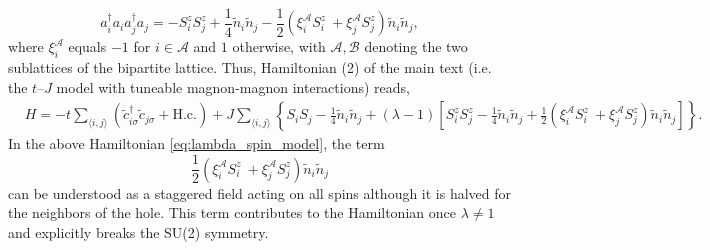 \documentclass[%
 reprint,
 amsmath,amssymb,
 aps,
prl,
]{revtex4-1}
\newcommand{\mean}[1]{\langle#1\rangle}
\begin{document}
\begin{equation}
    a_i^\dag a_i a_j^\dag a_j = -S_i^z S_j^z + \frac{1}{4}\tilde{n}_i\tilde{n}_j - \frac{1}{2}\left(\xi_i^\mathcal{A} S_i^z \ + \xi_j^\mathcal{A} S_j^z \right)\tilde{n}_i\tilde{n}_j,
\end{equation}
%
where $\xi_i^\mathcal{A}$ equals $-1$ for $i\in\mathcal{A}$ and $1$ otherwise, with $\mathcal{A},\mathcal{B}$ denoting the two sublattices of the bipartite lattice. Thus, Hamiltonian (2) of the main text (i.e. the $t$--$J$ model with tuneable magnon-magnon interactions) reads,
%
\begin{equation}
        \begin{aligned}
    	&H = -t\sum_{\mean{i,j}}\left(\tilde{c}_{i\sigma}^\dagger\tilde{c}_{j\sigma} + \text{H.c.}\right)
	+ J\sum_{\mean{i,j}}\left\{S_i S_j - \frac{1}{4}\tilde{n}_i\tilde{n}_j 
	+ \left(\lambda-1\right) \left[S_i^z S_j^z - \frac{1}{4}\tilde{n}_i\tilde{n}_j + \frac{1}{2}\left(\xi_i^\mathcal{A} S_i^z \ + \xi_j^\mathcal{A} S_j^z \right)\tilde{n}_i\tilde{n}_j\right] \right\}.
	\end{aligned}
	\label{eq:lambda_spin_model}
\end{equation}
In the above Hamiltonian \eqref{eq:lambda_spin_model}, the term
%
\begin{equation}
    \frac{1}{2}\left(\xi_i^\mathcal{A} S_i^z \ + \xi_j^\mathcal{A} S_j^z \right)\tilde{n}_i\tilde{n}_j
        \label{eq:staggered_term}
\end{equation}
%
can be understood as a staggered field acting on all spins although it is halved for the neighbors of the hole. This term contributes to the Hamiltonian once $\lambda \neq 1$ and explicitly breaks the SU(2) symmetry.  
\\
\end{document}
